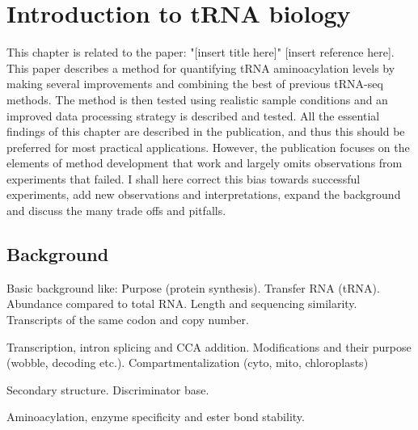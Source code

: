 \chapter{Introduction to tRNA biology}
This chapter is related to the paper: "[insert title here]" [insert reference here].
This paper describes a method for quantifying tRNA aminoacylation levels by making several improvements and combining the best of previous tRNA-seq methods.
The method is then tested using realistic sample conditions and an improved data processing strategy is described and tested.
All the essential findings of this chapter are described in the publication, and thus this should be preferred for most practical applications.
However, the publication focuses on the elements of method development that work and largely omits observations from experiments that failed.
I shall here correct this bias towards successful experiments, add new observations and interpretations, expand the background and discuss the many trade offs and pitfalls.


\section{Background}
Basic background like:
Purpose (protein synthesis).
Transfer RNA (tRNA).
Abundance compared to total RNA.
Length and sequencing similarity.
Transcripts of the same codon and copy number.

Transcription, intron splicing and CCA addition.
Modifications and their purpose (wobble, decoding etc.).
Compartmentalization (cyto, mito, chloroplasts)

Secondary structure.
Discriminator base.

Aminoacylation, enzyme specificity and ester bond stability.



